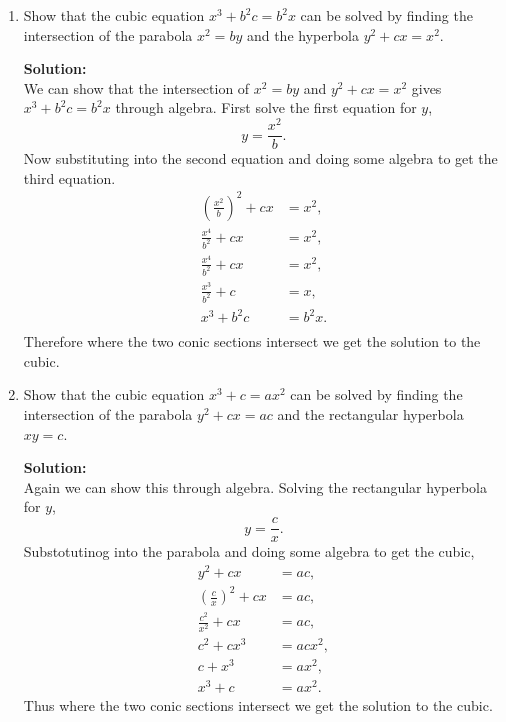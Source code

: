 \documentclass[12pt]{article}
\makeatletter
\theoremstyle{homework}
\newenvironment{exercise}[1]
{\def\@currentlabel{#1}\exercisecore}
{\endexercisecore}
\newcommand{\localhead}[1]{\par\smallskip\noindent\textbf{#1}\nobreak\\}%
\newcommand\solution{\localhead{Solution:}}
\makeatother
\begin{document}
\begin{exercise}{7}
  \begin{enumerate}
    \item Show that the cubic equation $x^3 + b^2c = b^2x$ can be solved by finding the intersection of the 
    parabola $x^2 = by$ and the hyperbola $y^2 + cx = x^2$.\\

    \solution We can show that the intersection of $x^2 = by$ and $y^2 + cx = x^2$ gives $x^3 + b^2c = b^2x$ through algebra.
    First solve the first equation for $y$, 
    \begin{equation*}
      y = \frac{x^2}{b}. 
    \end{equation*}
    Now substituting into the second equation and doing some algebra to get the third equation. 
    \begin{align*}
      (\frac{x^2}{b})^2 + cx &= x^2,\\
      \frac{x^4}{b^2} + cx &= x^2,\\
      \frac{x^4}{b^2} + cx &= x^2,\\
      \frac{x^3}{b^2} + c &= x,\\
      x^3 + b^2c &= b^2x.\\
    \end{align*}
    Therefore where the two conic sections intersect we get the solution to the cubic. 
    \vspace{.25in}


    \item Show that the cubic equation $x^3 + c = ax^2$ can be solved by finding the intersection of the parabola $y^2 + cx = ac$
    and the rectangular hyperbola $xy = c$. \\

    \solution Again we can show this through algebra. Solving the rectangular hyperbola for $y$,
    \begin{equation*}
      y = \frac{c}{x}.
    \end{equation*}
    Substotutinog into the parabola and doing some algebra to get the cubic,
    \begin{align*}
      y^2 + cx &= ac,\\
      (\frac{c}{x})^2 + cx &= ac,\\
      \frac{c^2}{x^2} + cx &= ac,\\
      c^2 + cx^3 &= acx^2,\\
      c + x^3 &= ax^2,\\
      x^3 + c &= ax^2.
    \end{align*}
    Thus where the two conic sections intersect we get the solution to the cubic. 
  \end{enumerate}
\end{exercise}
\vspace{.5in}
\end{document}
